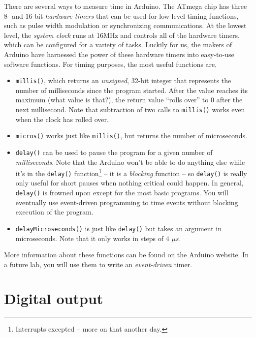 \documentclass[11pt]{article} %
\begin{document}
There are several ways to measure time in Arduino. The ATmega chip has three 8- and 16-bit \emph{hardware timers} that can be used for low-level timing functions, such as pulse width modulation or synchronizing communications. At the lowest level, the \emph{system clock} runs at 16MHz and controls all of the hardware timers, which can be configured for a variety of tasks. Luckily for us, the makers of Arduino have harnessed the power of these hardware timers into easy-to-use software functions. For timing purposes, the most useful functions are,
\begin{itemize}
\item \verb|millis()|, which returns an \emph{unsigned}, 32-bit integer that represents the number of milliseconds since the program started. After the value reaches its maximum (what value is that?), the return value “rolls over” to 0 after the next millisecond. Note that subtraction of two calls to \verb|millis()| works even when the clock has rolled over.
\item \verb|micros()| works just like \verb|millis()|, but returns the number of microseconds.
\item \verb|delay()| can be used to pause the program for a given number of \emph{milliseconds}. Note that the Arduino won’t be able to do anything else while it’s in the \verb|delay()| function\footnote{Interrupts excepted -- more on that another day.} -- it is a \emph{blocking} function -- so \verb|delay()| is really only useful for short pauses when nothing critical could happen. In general, \verb|delay()| is frowned upon except for the most basic programs. You will eventually use event-driven programming to time events without blocking execution of the program.
\item \verb|delayMicroseconds()| is just like \verb|delay()| but takes an argument in microseconds. Note that it only works in steps of 4 $\mu s$.
\end{itemize}

More information about these functions can be found on the Arduino website. In a future lab, you will use them to write an \emph{event-driven} timer.

\section*{Digital output}
\label{sec:digital.out}
\end{document}
